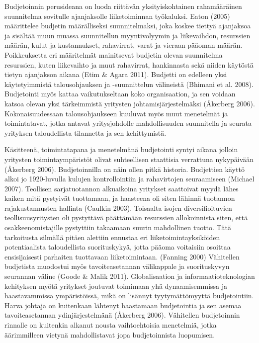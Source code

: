 \documentclass[12pt,a4paper,oneside,pdftex]{report}
\begin{document}
Budjetoinnin perusideana on luoda riittävän yksityiskohtainen rahamääräinen suunnitelma sovitulle ajanjaksolle liiketoiminnan työkaluksi. Eaton (2005) määrittelee budjetin määrälliseksi suunnitelmaksi, joka koskee tiettyä ajanjaksoa ja sisältää muun muassa suunnitellun myyntivolyymin ja liikevaihdon, resurssien määrän, kulut ja kustannukset, rahavirrat, varat ja vieraan pääoman määrän. Poikkeuksetta eri määritelmät mainitsevat budjetin olevan suunnitelma resurssien, kuten liikevaihto ja muut rahavirrat, hankinnasta sekä niiden käytöstä tietyn ajanjakson aikana (Etim & Agara 2011). Budjetti on edelleen yksi käytetyimmistä talousohjauksen ja -suunnittelun välineistä (Bhimani et al. 2008). Budjetointi myös kattaa vaikutukseltaan koko organisaation, ja sen voidaan katsoa olevan yksi tärkeimmistä yritysten johtamisjärjestelmäksi (Åkerberg 2006). Kokonaisuudessaan talousohjaukseen kuuluvat myös muut menetelmät ja toimintatavat, jotka antavat yritysjohdolle mahdollisuuden suunnitella ja seurata yrityksen taloudellista tilannetta ja sen kehittymistä.

Käsitteenä, toimintatapana ja menetelmänä budjetointi syntyi aikana jolloin yritysten toimintaympäristöt olivat suhteellisen staattisia verrattuna nykypäivään (Åkerberg 2006). Budjetoinnilla on näin ollen pitkä historia. Budjettien käyttö alkoi jo 1920-luvulla kulujen kontrollointiin ja rahavirtojen seuraamiseen (Michael 2007). Teollisen sarjatuotannon alkuaikoina yritykset saattoivat myydä lähes kaiken mitä pystyivät tuottamaan, ja haasteena oli siten lähinnä tuotannon rajakustannusten hallinta (Caulkin 2003). Toisaalta isojen diversifioituvien teollisuusyritysten oli pystyttävä päättämään resurssien allokoinnista siten, että osakkeenomistajille pystyttiin takaamaan suurin mahdollinen tuotto. Tätä tarkoitusta silmällä pitäen alettiin ennustaa eri liiketoimintayksiköiden potentiaalista taloudellista suorituskykyä, jotta pääoma voitaisiin osoittaa ensisijaisesti parhaiten tuottavaan liiketoimintaan. (Fanning 2000) Vähitellen budjetista muodostui myös tavoiteasetannan välikappale ja suorituskyvyn seurannan väline (Goode & Malik 2011). Globalisaation ja informaatioteknologian kehityksen myötä yritykset joutuvat toimimaan yhä dynaamisemmissa ja haastavammissa ympäristöissä, mikä on lisännyt tyytymättömyyttä budjetointiin. Harva johtaja on kuitenkaan lähtenyt haastamaan budjetointia ja sen asemaa tavoiteasetannan ydinjärjestelmänä (Åkerberg 2006). Vähitellen budjetoinnin rinnalle on kuitenkin alkanut nousta vaihtoehtoisia menetelmiä, jotka äärimmilleen vietynä mahdollistavat jopa budjetoinnista luopumisen.
\end{document}

